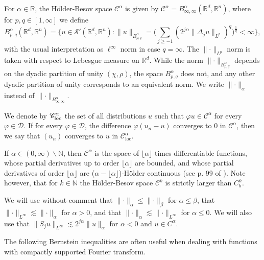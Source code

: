 \documentclass[11pt,a4paper]{article}
\newcommand{\cdummy}{\cdot}
\newcommand{\tmop}[1]{\ensuremath{\operatorname{#1}}}
\theoremstyle{remark}
\newcommand{\CC}{\ensuremath{\mathscr{C}}}
\newcommand{\CD}{\ensuremath{\mathscr{D}}}
\newcommand{\CS}{\ensuremath{\mathscr{S}}}
\begin{document}
For $\alpha \in \mathbb{R}$, the H{\"o}lder-Besov space $\CC^{\alpha}$ is given by $\CC^{\alpha} =B^{\alpha}_{\infty , \infty} (\mathbb{R}^{d},\mathbb{R}^{n} )$, where for $p,q \in [1, \infty ]$ we define
\[
   B^{\alpha}_{p,q} (\mathbb{R}^{d} ,\mathbb{R}^{n} ) = \bigg\{ u \in \CS'(\mathbb{R}^{d} ,\mathbb{R}^{n} ):\|u\|_{B^{\alpha}_{p,q}} = \bigg(\sum_{j \geqslant -1} (2^{j \alpha} \| \Delta_{j} u\|_{L^{p}} )^{q} \bigg)^{\frac{1}{q}} < \infty \bigg\},
\]
with the usual interpretation as $\ell^{\infty}$ norm in case $q= \infty$. The $\lVert \cdummy \rVert_{L^{p}}$ norm is taken with respect to Lebesgue measure on $\mathbb{R}^{d}$. While the norm $\lVert \cdummy \rVert_{B^{\alpha}_{p,q}}$ depends on the dyadic partition of unity $( \chi , \rho )$, the space $B^{\alpha}_{p,q}$ does not, and any other dyadic partition of unity corresponds to an equivalent norm. We write $\lVert \cdummy \rVert_{\alpha}$ instead of $\lVert \cdummy \rVert_{B^{\alpha}_{\infty , \infty}}$.

We denote by $\CC^{\alpha}_{\text{\tmop{loc}}}$ the set of all distributions $u$ such that $\varphi u \in \CC^{\alpha}$ for every $\varphi \in \CD$. If for every $\varphi \in \CD$, the difference $\varphi(u_n - u)$ converges to $0$ in $\CC^\alpha$, then we say that $(u_n)$ converges to $u$ in $\CC^\alpha_{\tmop{loc}}$.

If $\alpha \in (0, \infty ) \backslash \mathbb{N}$, then $\CC^{\alpha}$ is the space of $\lfloor \alpha \rfloor$ times differentiable functions, whose partial derivatives up to order $\lfloor \alpha \rfloor$ are bounded, and whose partial derivatives of order $\lfloor \alpha \rfloor$ are ($\alpha - \lfloor \alpha \rfloor$)-H{\"o}lder continuous (see p. 99 of {\cite{Bahouri2011}}). Note however, that for $k \in \mathbb{N}$ the H{\"o}lder-Besov space $\CC^{k}$ is strictly larger than $C^{k}_{b}$.

We will use without comment that $\lVert \cdummy \rVert_{\alpha} \leqslant \lVert \cdummy \rVert_{\beta}$ for $\alpha \leqslant \beta$, that $\lVert \cdummy \rVert_{L^{\infty}} \lesssim \lVert \cdummy \rVert_{\alpha}$ for $\alpha >0$, and that $\lVert \cdummy \rVert_{\alpha} \lesssim \lVert \cdummy \rVert_{L^{\infty}}$ for $\alpha \leqslant 0$. We will also use that $\|S_{j} u\|_{L^{\infty}} \lesssim 2^{j \alpha} \|u\|_{\alpha}$ for $\alpha <0$ and $u \in C^{\alpha}$.


The following Bernstein inequalities are often useful when dealing with functions with compactly supported Fourier transform.
\end{document}
